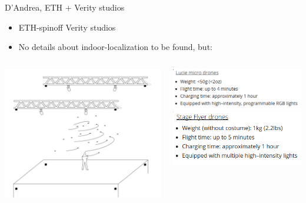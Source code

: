\documentclass[aspectratio=169]{beamer}
\begin{document}
\begin{frame}{D'Andrea, ETH + Verity studios}
\begin{itemize}
	\item ETH-spinoff Verity studios
	\item No details about indoor-localization to be found, but:
\end{itemize}
\begin{columns}
\begin{column}{0.49\textwidth}
	\includegraphics[width=\textwidth]{images/verity_loca.png}
\end{column}	
\begin{column}{0.49\textwidth}
	\includegraphics[width=\textwidth]{images/verity_specs.png}\\
		\includegraphics[width=\textwidth]{images/verity_specs2.png}
\end{column}
\end{columns}
\tiny{\color{gray}{https://veritystudios.com/products/\#synthetic-swarm}}
\end{frame}
\end{document}
